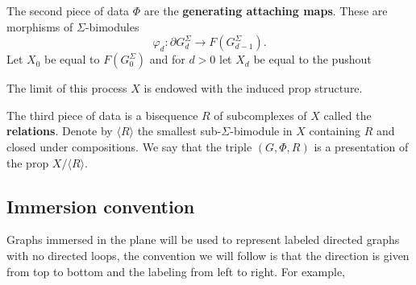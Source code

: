 The second piece of data $\Phi$ are the \textbf{generating attaching maps}. These are morphisms of $\Sigma$-bimodules
\begin{equation*}
\varphi_d: \partial G_d^\Sigma \to F(G^\Sigma_{d-1}).
\end{equation*}
Let $X_0$ be equal to $F(G^\Sigma_0)$ and for $d > 0$ let $X_d$ be equal to the pushout
\begin{center}
\end{center}
The limit of this process $X$ is endowed with the induced prop structure.

The third piece of data is a bisequence $R$ of subcomplexes of $X$ called the \textbf{relations}. Denote by $\langle R \rangle$ the smallest sub-$\Sigma$-bimodule in $X$ containing $R$ and closed under compositions. We say that the triple $(G,\Phi,R)$ is a presentation of the prop $X/\langle R\rangle$.

\subsection{Immersion convention} Graphs immersed in the plane will be used to represent labeled directed graphs with no directed loops, the convention we will follow is that the direction is given from top to bottom and the labeling from left to right. For example,

